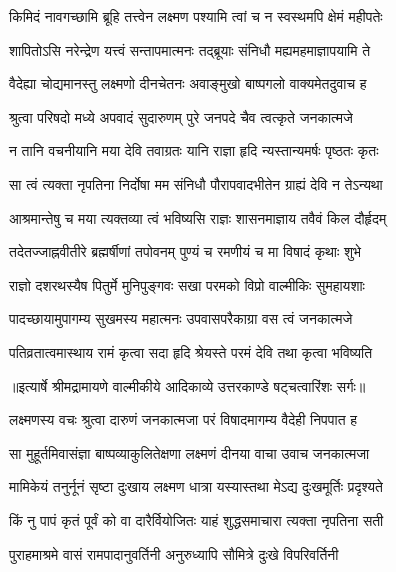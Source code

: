\twolineshloka
{किमिदं नावगच्छामि ब्रूहि तत्त्वेन लक्ष्मण}
{पश्यामि त्वां च न स्वस्थमपि क्षेमं महीपतेः} %

\twolineshloka
{शापितोऽसि नरेन्द्रेण यत्त्वं सन्तापमात्मनः}
{तद्ब्रूयाः संनिधौ मह्यमहमाज्ञापयामि ते} %

\twolineshloka
{वैदेह्या चोद्यमानस्तु लक्ष्मणो दीनचेतनः}
{अवाङ्मुखो बाष्पगलो वाक्यमेतदुवाच ह} %

\twolineshloka
{श्रुत्वा परिषदो मध्ये अपवादं सुदारुणम्}
{पुरे जनपदे चैव त्वत्कृते जनकात्मजे} %

\twolineshloka
{न तानि वचनीयानि मया देवि तवाग्रतः}
{यानि राज्ञा हृदि न्यस्तान्यमर्षः पृष्ठतः कृतः} %

\twolineshloka
{सा त्वं त्यक्ता नृपतिना निर्दोषा मम संनिधौ}
{पौरापवादभीतेन ग्राह्यं देवि न तेऽन्यथा} %

\twolineshloka
{आश्रमान्तेषु च मया त्यक्तव्या त्वं भविष्यसि}
{राज्ञः शासनमाज्ञाय तवैवं किल दौर्हृदम्} %

\twolineshloka
{तदेतज्जाह्नवीतीरे ब्रह्मर्षीणां तपोवनम्}
{पुण्यं च रमणीयं च मा विषादं कृथाः शुभे} %

\twolineshloka
{राज्ञो दशरथस्यैष पितुर्मे मुनिपुङ्गवः}
{सखा परमको विप्रो वाल्मीकिः सुमहायशाः} %

\twolineshloka
{पादच्छायामुपागम्य सुखमस्य महात्मनः}
{उपवासपरैकाग्रा वस त्वं जनकात्मजे} %

\twolineshloka
{पतिव्रतात्वमास्थाय रामं कृत्वा सदा हृदि}
{श्रेयस्ते परमं देवि तथा कृत्वा भविष्यति} %


{॥इत्यार्षे श्रीमद्रामायणे वाल्मीकीये आदिकाव्ये उत्तरकाण्डे षट्चत्वारिंशः सर्गः॥}


\twolineshloka
{लक्ष्मणस्य वचः श्रुत्वा दारुणं जनकात्मजा}
{परं विषादमागम्य वैदेही निपपात ह} %

\twolineshloka
{सा मुहूर्तमिवासंज्ञा बाष्पव्याकुलितेक्षणा}
{लक्ष्मणं दीनया वाचा उवाच जनकात्मजा} %

\twolineshloka
{मामिकेयं तनुर्नूनं सृष्टा दुःखाय लक्ष्मण}
{धात्रा यस्यास्तथा मेऽद्य दुःखमूर्तिः प्रदृश्यते} %

\twolineshloka
{किं नु पापं कृतं पूर्वं को वा दारैर्वियोजितः}
{याहं शुद्धसमाचारा त्यक्ता नृपतिना सती} %

\twolineshloka
{पुराहमाश्रमे वासं रामपादानुवर्तिनी}
{अनुरुध्यापि सौमित्रे दुःखे विपरिवर्तिनी} %

